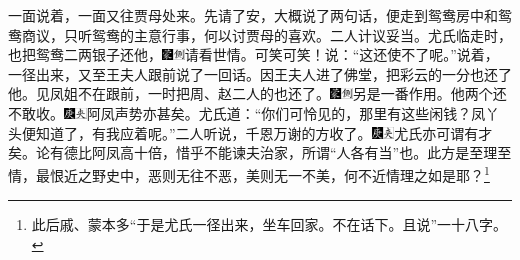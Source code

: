 一面说着，一面又往贾母处来。先请了安，大概说了两句话，便走到鸳鸯房中和鸳鸯商议，只听鸳鸯的主意行事，何以讨贾母的喜欢。二人计议妥当。尤氏临走时，也把鸳鸯二两银子还他，{\includegraphics[width=3mm]{../Images/00006}\includegraphics[width=3mm]{../Images/00011}\footnotesize \kaishu 请看世情。可笑可笑！}说：“这还使不了呢。”说着，一径出来，又至王夫人跟前说了一回话。因王夫人进了佛堂，把彩云的一分也还了他。见凤姐不在跟前，一时把周、赵二人的也还了。{\includegraphics[width=3mm]{../Images/00006}\includegraphics[width=3mm]{../Images/00011}\footnotesize \kaishu 另是一番作用。}他两个还不敢收。{\includegraphics[width=3mm]{../Images/00004}\includegraphics[width=3mm]{../Images/00012}\footnotesize \kaishu 阿凤声势亦甚矣。}尤氏道：“你们可怜见的，那里有这些闲钱？凤丫头便知道了，有我应着呢。”二人听说，千恩万谢的方收了。{\includegraphics[width=3mm]{../Images/00004}\includegraphics[width=3mm]{../Images/00012}\footnotesize \kaishu 尤氏亦可谓有才矣。论有德比阿凤高十倍，惜乎不能谏夫治家，所谓“人各有当”也。此方是至理至情，最恨近之野史中，恶则无往不恶，美则无一不美，何不近情理之如是耶？}\footnote{此后戚、蒙本多“于是尤氏一径出来，坐车回家。不在话下。且说”一十八字。}

